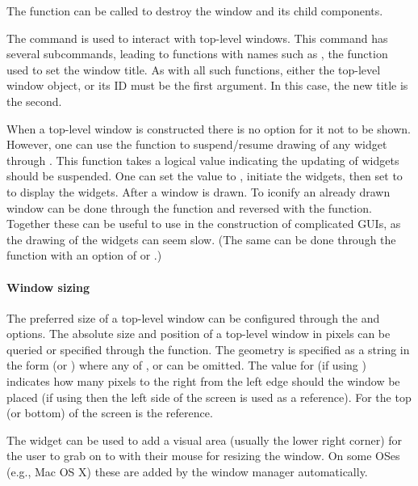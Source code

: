 The  function can be called to destroy the window
and its child components.

The \TK\/ command  is used to interact with top-level
windows. This command has several subcommands, leading to 
functions with names such as , the function
used to set the window title. As with all such functions, either the
top-level window object, or its ID must be the first argument. In this
case, the new title is the second.

When a top-level window is constructed there is no option for it not
to be shown.  However, one can use the 
function to suspend/resume drawing of any widget through \TK. This
function takes a logical value indicating the updating of widgets
should be suspended. One can set the value to , initiate
the widgets, then set to  to display the widgets.  After a
window is drawn. To iconify an already drawn window can be done
through the  function and reversed with the
 function. Together these can be useful to
use in the construction of complicated GUIs, as the drawing of the
widgets can seem slow. (The same can be done through the
 function with an option of  or
.)
 
\paragraph{Window sizing}
The preferred size of a top-level window can be configured through the
 and  options. The absolute size and position
of a top-level window in pixels can be queried or specified through
the  function. The geometry is specified as a
string in the form  (or \code{-}) where any of
\code{=},  or  can be omitted. The value for
 (if using \code{+}) indicates how many pixels to the right
from the left edge should the window be placed (if using \code{-} then
the left side of the screen is used as a reference). For  the
top (or bottom) of the screen is the reference.

The  widget can be used to add a visual area (usually the lower right corner) for the user to grab on to with their mouse for resizing the window. On some OSes (e.g., Mac OS X) these are added by the window manager automatically. 


